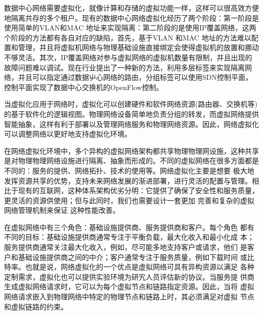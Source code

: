 数据中心网络需要虚拟化，就像计算和存储的虚拟功能一样，这样可以很高效方便地隔离共存的多个租户。现有的数据中心网络虚拟化经历了两个阶段：第一阶段是使用简单的VLAN和MAC 地址来实现隔离：第二阶段的是使用IP覆盖网络，这两个阶段的方法都有各自对应的缺陷，首先，基于VLAN 和MAC 地址的方法难以配置和管理，并且将虚拟机网络与物理基础设施直接绑定会使得虚拟机的放置和挪动不够灵活。其次，IP覆盖网络对参与虚拟网络的虚拟机数量有限制，并且出现的故障问题难以调试。现在行业提出了一种新的方法，利用多层标签来实现隔离网络，并且可以指定通过数据屮心网络的路由，分组标签可以使用SDN控制平面，控制平面实现了数据中心交换机的OpenFlow控制。


当虚拟化应用于网络时，虚拟化可以创建硬件和软件网络资源(路由器、交换机等)的基于软件化的逻辑视图。物理网络设备简单地负责分组的转发，而虚拟网络提供智能抽象，这样有利于部署以及管理网络服务和物理网络资源。因此，网络虚拟化可以调整网络以更好地支持虚拟化环境。


在网络虚拟化环境中，多个异构的虚拟网络架构都共享物理物理网设施，这种共享是对物理物理网络设施进行隔离、抽象而形成的。不同的虚拟网络在很多方面都是不同的：服务的提供、网络拓扑、技术的使用等。网络虚拟化主要是想要 极大地发挥资源共享的优势，支持未来网络发展的渐进部署，进行灵活的配置与管理。相比于现有的互联网，这种体系架构优劣分明：它提供了确保了安全性和服务质量，更灵活的资源供使用；但与此同时，我们也需要设计一套更加 完善和复杂的虚拟网络管理机制来保证 这种性能改善。

在虚拟网络中有三个角色：基础设施提供商、服务提供商和客户。每个角色 都有不同的目标：基础设施提供商通常专注于平衡负载，最大化收入和最小化成 本；服务提供商通常关注最大化收入，例如，尽可能多地支持客户或请求，他们 是客户和基础设施提供商之间的中介；客户通常专注于服务质量，例如下载时间 或比特率。也就是说，网络虚拟化的一个优点是虚拟网络可具有异构资源以满足 各种定制需求，虚拟化也可以提供实验环境为研宄人员评估新的协议。当服务提 供商生成虚拟网络请求时，它可以为每个虚拟节点和链路指定资源。因此，当将 虚拟网络请求嵌入到物理网络中特定的物理节点和链路上时，其必须满足对虚拟 节点和虚拟链路的约束。


